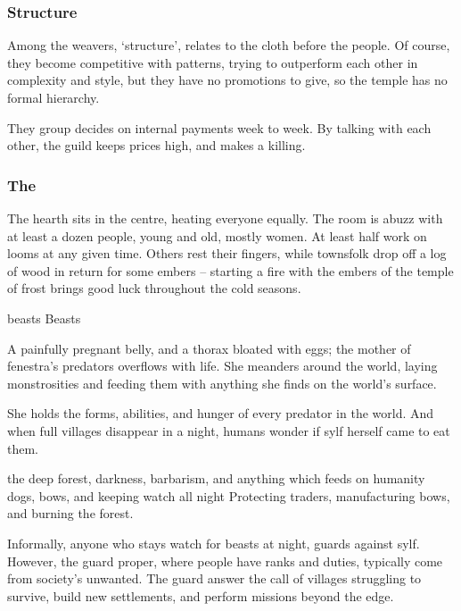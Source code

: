 \begin{multicols}{2}
\subsubsection{Structure}

Among the weavers, `structure', relates to the cloth before the people.
Of course, they become competitive with patterns, trying to outperform each other in complexity and style, but they have no promotions to give, so the temple has no formal hierarchy.

They group decides on internal payments week to week.
By talking with each other, the guild keeps prices high, and makes a killing.

\subsubsection{The }

The hearth sits in the centre, heating everyone equally.
The room is abuzz with at least a dozen people, young and old, mostly women.
At least half work on looms at any given time.
Others rest their fingers, while townsfolk drop off a log of wood in return for some embers -- starting a fire with the embers of the temple of frost brings good luck throughout the cold seasons.


  {\gls{beasts}}%
  {Beasts}%
  {%
    A painfully pregnant belly, and a thorax bloated with eggs; the mother of \gls{fenestra}'s predators overflows with life.
    She meanders around the world, laying monstrosities and feeding them with anything she finds on the world's surface.

    She holds the forms, abilities, and hunger of every predator in the world.
    And when full \glspl{village} disappear in a night, humans wonder if \gls{sylf} herself came to eat them.
  }%
  {the deep forest, darkness, barbarism, and anything which feeds on humanity}%
  {dogs, bows, and keeping watch all night}%
  {}%
  {
    Protecting traders, manufacturing bows, and burning the forest.
  }%

Informally, anyone who stays watch for beasts at night, guards against \gls{sylf}.
However, the \gls{guard} proper, where people have ranks and duties, typically come from society's unwanted.
The \gls{guard} answer the call of \glspl{village} struggling to survive, build new settlements, and perform missions beyond the \gls{edge}.


\end{multicols}
